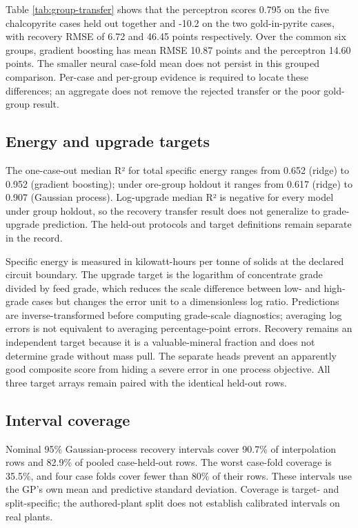 \documentclass[10pt]{article}
\begin{document}
Table \ref{tab:group-transfer} shows that the perceptron scores 0.795 on the five chalcopyrite cases held out together
and -10.2 on the two gold-in-pyrite cases, with recovery RMSE of 6.72
and 46.45 points respectively. Over the common six groups, gradient
boosting has mean RMSE 10.87 points and the perceptron 14.60 points. The
smaller neural case-fold mean does not persist in this grouped
comparison. Per-case and per-group evidence is required to locate these
differences; an aggregate does not remove the rejected transfer or the
poor gold-group result.

\subsection{Energy and upgrade
targets}\label{energy-and-upgrade-targets}

The one-case-out median R² for total specific energy ranges from 0.652
(ridge) to 0.952 (gradient boosting); under ore-group holdout it ranges
from 0.617 (ridge) to 0.907 (Gaussian process). Log-upgrade median R² is
negative for every model under group holdout, so the recovery transfer
result does not generalize to grade-upgrade prediction. The held-out
protocols and target definitions remain separate in the record.

Specific energy is measured in kilowatt-hours per tonne of solids at the
declared circuit boundary. The upgrade target is the logarithm of
concentrate grade divided by feed grade, which reduces the scale
difference between low- and high-grade cases but changes the error unit
to a dimensionless log ratio. Predictions are inverse-transformed before
computing grade-scale diagnostics; averaging log errors is not
equivalent to averaging percentage-point errors. Recovery remains an
independent target because it is a valuable-mineral fraction and does
not determine grade without mass pull. The separate heads prevent an
apparently good composite score from hiding a severe error in one
process objective. All three target arrays remain paired with the
identical held-out rows.

\subsection{Interval coverage}\label{interval-coverage}

Nominal 95\% Gaussian-process recovery intervals cover 90.7\% of
interpolation rows and 82.9\% of pooled case-held-out rows. The worst
case-fold coverage is 35.5\%, and four case folds cover fewer than 80\%
of their rows. These intervals use the GP's own mean and predictive
standard deviation. Coverage is target- and split-specific; the
authored-plant split does not establish calibrated intervals on real
plants.
\end{document}
